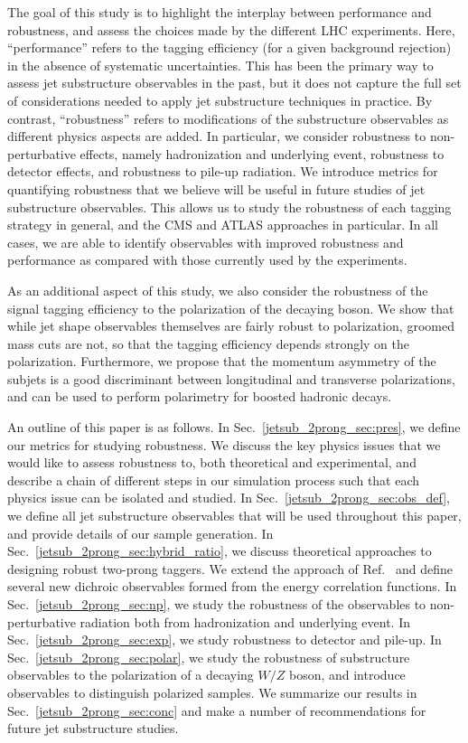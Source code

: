 \documentclass[11pt]{cernrep}
\begin{document}
The goal of this study is to highlight the interplay between performance and robustness, and assess the choices made by the different LHC experiments.
%
Here, ``performance'' refers to the tagging efficiency (for a given background rejection) in the absence of systematic uncertainties.
%
This has been the primary way to assess jet substructure observables in the past, but it does not capture the full set of considerations needed to apply jet substructure techniques in practice.
%
By contrast, ``robustness'' refers to modifications of the substructure observables as different physics aspects are added.
%
In particular, we consider robustness to non-perturbative effects, namely hadronization and underlying event, robustness to detector effects, and robustness to pile-up radiation.
%
We introduce metrics for quantifying robustness that we believe will be useful in future studies of jet substructure observables.
%
This allows us to study the robustness of each tagging strategy in general, and the CMS and ATLAS approaches in particular.
%
In all cases, we are able to identify observables with improved robustness and performance as compared with those currently used by the experiments.
%
%


As an additional aspect of this study, we also consider the robustness of the signal tagging efficiency to the polarization of the decaying boson. We show that while jet shape observables themselves are fairly robust to polarization, groomed mass cuts are not, so that the tagging efficiency depends strongly on the polarization. Furthermore, we propose that the momentum  asymmetry of the subjets is a good discriminant between longitudinal and transverse polarizations, and can be used to perform polarimetry for boosted hadronic decays. 







An outline of this paper is as follows.
%
In Sec.~\ref{jetsub_2prong_sec:pres}, we define our metrics for studying robustness.
%
We discuss the key physics issues that we would like to assess robustness to, both theoretical and experimental, and describe a chain of different steps in our simulation process such that each physics issue can be isolated and studied.
%
In Sec.~\ref{jetsub_2prong_sec:obs_def}, we define all jet substructure observables that will be used throughout this paper, and  provide details of our sample generation.
%
In Sec.~\ref{jetsub_2prong_sec:hybrid_ratio}, we discuss theoretical approaches to designing robust two-prong taggers.
%
We extend the approach of Ref.~\cite{Salam:2016yht} and define several new dichroic observables formed from the energy correlation functions.  
%
In Sec.~\ref{jetsub_2prong_sec:np}, we study the robustness of the observables to non-perturbative radiation both from hadronization and underlying event.
%
In Sec.~\ref{jetsub_2prong_sec:exp}, we study robustness to detector and pile-up.
%
In Sec.~\ref{jetsub_2prong_sec:polar}, we study the robustness of substructure observables to the polarization of a decaying $W/Z$ boson, and introduce observables to distinguish polarized samples.
%
We summarize our results in Sec.~\ref{jetsub_2prong_sec:conc} and make a number of recommendations for future jet substructure studies.
\end{document}

